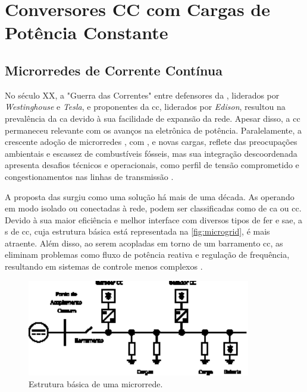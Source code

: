 \chapter{Conversores CC com Cargas de Potência Constante} \label{cap3}

\section{Microrredes de Corrente Contínua}

No século XX, a "Guerra das Correntes" entre defensores da , liderados por \textit{Westinghouse} e \textit{Tesla}, e proponentes da \acrshort{cc}, liderados por \textit{Edison}, resultou na prevalência da \acrshort{ca} devido à sua facilidade de expansão da rede. Apesar disso, a \acrshort{cc} permaneceu relevante com os avanços na eletrônica de potência. Paralelamente, a crescente adoção de microrredes , com ,  e novas cargas, reflete das preocupações ambientais e escassez de combustíveis fósseis, mas sua integração descoordenada apresenta desafios técnicos e operacionais, como perfil de tensão comprometido e congestionamentos nas linhas de transmissão \citep{Elsayed2015, Dragicevic2015}.

A proposta das  surgiu como uma solução há mais de uma década. As  operando em modo isolado ou conectadas à rede, podem ser classificadas como  de \acrshort{ca} ou \acrshort{cc}. Devido à sua maior eficiência e melhor interface com diversos tipos de \acrshort{fer} e \acrshort{sae}, a s de \acrshort{cc}, cuja estrutura básica está representada na \autoref{fig:microgrid}, é mais atraente. Além disso, ao serem acopladas em torno de um barramento \acrshort{cc}, as  eliminam problemas como fluxo de potência reativa e regulação de frequência, resultando em sistemas de controle menos complexos \citep{Dragicevic2015}.

\begin{figure}[H]
  \centering
  \includegraphics[width=0.87\textwidth]{figuras/microgrid.eps}
  \caption{Estrutura básica de uma microrrede.}
  \label{fig:microgrid}
\end{figure}


